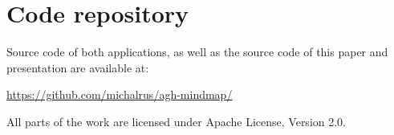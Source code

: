 %
%
%
%
%

\section{Code repository}
\label{sec:code-repo}

Source code of both applications, as well as the source code of this paper and presentation are available at:

\begin{center}
	\href{https://github.com/michalrus/agh-mindmap/}{https://github.com/michalrus/agh-mindmap/}
\end{center}

All parts of the work are licensed under Apache License, Version 2.0.
